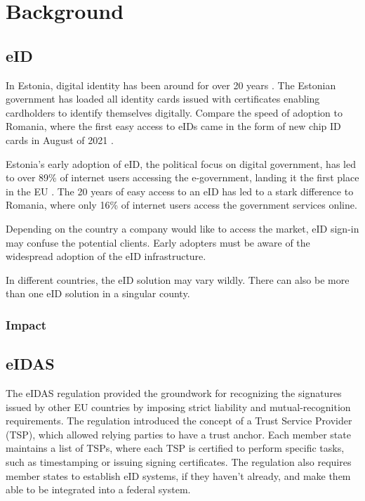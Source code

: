 \section{Background}




\subsection{eID}

In Estonia, digital identity has been around for over 20 years \cite{eelaw-idcard}. The Estonian government has loaded all identity cards issued with certificates enabling cardholders to identify themselves digitally. Compare the speed of adoption to Romania, where the first easy access to eIDs came in the form of new chip ID cards in August of 2021 \cite{romania-adopts-eid}.

Estonia's early adoption of eID, the political focus on digital government, has led to over 89\% of internet users accessing the e-government, landing it the first place in the EU \cite{eu-desi}. The 20 years of easy access to an eID has led to a stark difference to Romania, where only 16\% of internet users access the government services online.

Depending on the country a company would like to access the market, eID sign-in may confuse the potential clients. Early adopters must be aware of the widespread adoption of the eID infrastructure.

In different countries, the eID solution may vary wildly. There can also be more than one eID solution in a singular county.

\subsubsection{Impact }



\subsection{eIDAS}

The eIDAS regulation \cite{eulaw-eidas} provided the groundwork for recognizing the signatures issued by other EU countries by imposing strict liability and mutual-recognition requirements. The regulation introduced the concept of a Trust Service Provider (TSP), which allowed relying parties to have a trust anchor. Each member state maintains a list of TSPs, where each TSP is certified to perform specific tasks, such as timestamping or issuing signing certificates. The regulation also requires member states to establish eID systems, if they haven't already, and make them able to be integrated into a federal system.

